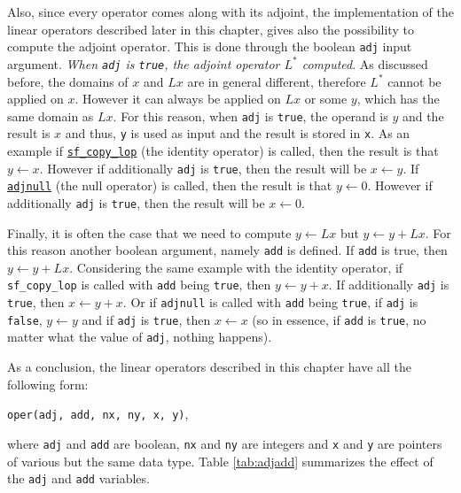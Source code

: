 Also, since every operator comes along with its adjoint, the implementation of the linear operators described later in this chapter, gives also the possibility to compute the adjoint operator. This is done through the boolean \texttt{adj} input argument. {\it When {\rm\texttt{adj}} is {\rm\texttt{true}}, the adjoint operator $L^*$ computed}. As discussed before, the domains of $x$ and $Lx$ are in general different, therefore $L^*$ cannot be applied on $x$. However it can always be applied on $Lx$ or some $y$, which has the same domain as $Lx$. For this reason, when \texttt{adj} is \texttt{true}, the operand is $y$ and the result is $x$ and thus, \texttt{y} is used as input and the result is stored in \texttt{x}. As an example if \hyperref[sec:sf_copy_lop]{\texttt{sf\_copy\_lop}} (the identity operator) is called, then the result is that $y\leftarrow x$. However if additionally \texttt{adj} is \texttt{true}, then the result will be $x\leftarrow y$. If \hyperref[sec:adjnull]{\texttt{adjnull}} (the null operator) is called, then the result is that $y\leftarrow 0$. However if additionally \texttt{adj} is \texttt{true}, then the result will be $x\leftarrow 0$.

Finally, it is often the case that we need to compute $y\leftarrow Lx$ but $y\leftarrow y+Lx$. For this reason another boolean argument, namely \texttt{add} is defined. If \texttt{add} is true, then $y\leftarrow y+Lx$. Considering the same example with the identity operator, if \texttt{sf\_copy\_lop} is called with \texttt{add} being \texttt{true}, then $y\leftarrow y+x$. If additionally \texttt{adj} is \texttt{true}, then $x\leftarrow y+x$. Or if \texttt{adjnull} is called with \texttt{add} being \texttt{true}, if \texttt{adj} is \texttt{false}, $y\leftarrow y$ and if \texttt{adj} is \texttt{true}, then $x\leftarrow x$ (so in essence, if \texttt{add} is \texttt{true}, no matter what the value of \texttt{adj}, nothing happens).

As a conclusion, the linear operators described in this chapter have all the following form:
\begin{center}\texttt{oper(adj, add, nx, ny, x, y)},\end{center} 
where \texttt{adj} and \texttt{add} are boolean, \texttt{nx} and \texttt{ny} are integers and \texttt{x} and \texttt{y} are pointers of various but the same data type. Table \ref{tab:adjadd} summarizes the effect of the \texttt{adj} and \texttt{add} variables.

